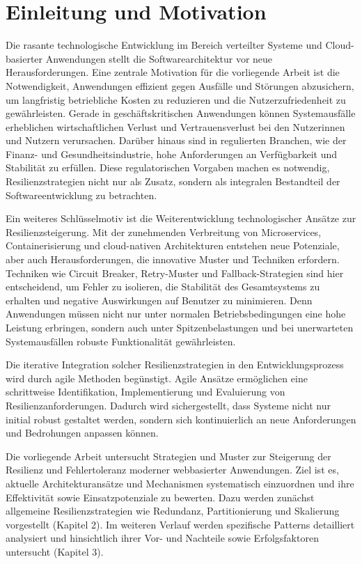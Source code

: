 \section{Einleitung und Motivation}

Die rasante technologische Entwicklung im Bereich verteilter Systeme und Cloud-basierter Anwendungen stellt
die Softwarearchitektur vor neue Herausforderungen.
Eine zentrale Motivation für die vorliegende Arbeit ist die Notwendigkeit, Anwendungen effizient gegen
Ausfälle und Störungen abzusichern, um langfristig betriebliche Kosten zu reduzieren und die Nutzerzufriedenheit
zu gewährleisten.
Gerade in geschäftskritischen Anwendungen können Systemausfälle erheblichen wirtschaftlichen Verlust und
Vertrauensverlust bei den Nutzerinnen und Nutzern verursachen.
Darüber hinaus sind in regulierten Branchen, wie der Finanz- und Gesundheitsindustrie,
hohe Anforderungen an Verfügbarkeit und Stabilität zu erfüllen.
Diese regulatorischen Vorgaben machen es notwendig, Resilienzstrategien nicht nur als Zusatz,
sondern als integralen Bestandteil der Softwareentwicklung zu betrachten.

Ein weiteres Schlüsselmotiv ist die Weiterentwicklung technologischer Ansätze zur Resilienzsteigerung.
Mit der zunehmenden Verbreitung von Microservices, Containerisierung und cloud-nativen Architekturen
entstehen neue Potenziale, aber auch Herausforderungen, die innovative Muster und Techniken erfordern.
Techniken wie Circuit Breaker, Retry-Muster und Fallback-Strategien sind hier entscheidend, um Fehler zu isolieren,
die Stabilität des Gesamtsystems zu erhalten und negative Auswirkungen auf Benutzer zu minimieren.
Denn Anwendungen müssen nicht nur unter normalen Betriebsbedingungen eine hohe Leistung erbringen,
sondern auch unter Spitzenbelastungen und bei unerwarteten Systemausfällen robuste Funktionalität gewährleisten.


Die iterative Integration solcher Resilienzstrategien in den Entwicklungsprozess wird durch agile Methoden begünstigt.
Agile Ansätze ermöglichen eine schrittweise Identifikation, Implementierung und Evaluierung von Resilienzanforderungen.
Dadurch wird sichergestellt, dass Systeme nicht nur initial robust gestaltet werden,
sondern sich kontinuierlich an neue Anforderungen und Bedrohungen anpassen können.


Die vorliegende Arbeit untersucht Strategien und Muster zur Steigerung der Resilienz
und Fehlertoleranz moderner webbasierter Anwendungen.
Ziel ist es, aktuelle Architekturansätze und Mechanismen systematisch einzuordnen und ihre Effektivität sowie
Einsatzpotenziale zu bewerten.
Dazu werden zunächst allgemeine Resilienzstrategien wie Redundanz, Partitionierung und Skalierung vorgestellt (Kapitel 2).
Im weiteren Verlauf werden spezifische Patterns detailliert analysiert
und hinsichtlich ihrer Vor- und Nachteile sowie Erfolgsfaktoren untersucht (Kapitel 3).


